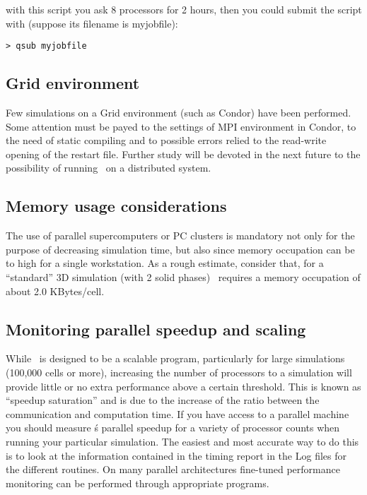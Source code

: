 with this script you ask 8 processors for 2 hours, then
you could submit the script with 
(suppose its filename is myjobfile):

\begin{verbatim}
> qsub myjobfile
\end{verbatim}

\subsection{Grid environment}

Few simulations on a Grid environment (such as Condor) have been performed.
Some attention must be payed to the settings of MPI environment in Condor,
to the need of static compiling and to possible errors relied to the
read-write opening of the restart file. Further study will be devoted in
the next future to the possibility of running \PDAC\ on a distributed
system.

\subsection{Memory usage considerations}
The use of parallel supercomputers or PC clusters is mandatory not only
for the purpose of decreasing simulation time, but also since memory
occupation can be to high for a single workstation. As a rough estimate,
consider that, for a ``standard'' 3D simulation (with 2 solid phases) 
\PDAC\ requires a memory occupation of about 2.0 KBytes/cell. 

\subsection{Monitoring parallel speedup and scaling}

While \PDAC\ is designed to be a scalable program, particularly for
large simulations (100,000 cells or more), increasing the number of
processors to a simulation will provide little or no extra performance
above a certain threshold. This is known as ``speedup saturation'' and is
due to the increase of the ratio between the communication and computation
time. If you have access to a parallel machine you should
measure \PDAC\'s parallel speedup for a variety of processor counts when
running your particular simulation. The easiest and most accurate way
to do this is to look at the information contained in the timing report
in the Log files for the different routines. On many parallel architectures
fine-tuned performance monitoring can be performed through appropriate programs.
